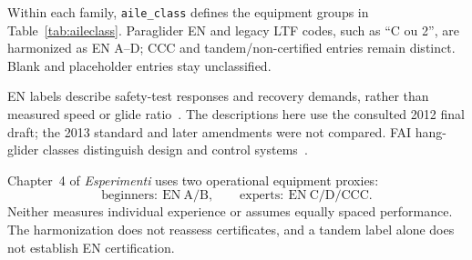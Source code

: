 Within each family, \texttt{aile\_class} defines the equipment groups in
Table~\ref{tab:aileclass}. Paraglider EN and legacy LTF codes, such as
\enquote{C ou 2}, are harmonized as EN A--D; CCC and tandem/non-certified entries
remain distinct. Blank and placeholder entries stay unclassified.

EN labels describe safety-test responses and recovery demands, rather than
measured speed or glide ratio~\cite{fpren926_2_2012}. The descriptions here use
the consulted 2012 final draft; the 2013 standard and later amendments were not
compared. FAI hang-glider classes distinguish design and control
systems~\cite{fai_sc7_2024}.

Chapter~4 of \emph{Esperimenti} uses two operational equipment proxies:
\[
 \text{beginners}:\ \mathrm{EN\ A/B},\qquad
 \text{experts}:\ \mathrm{EN\ C/D/CCC}.
\]
Neither measures individual experience or assumes equally spaced performance.
The harmonization does not reassess certificates, and a tandem label alone does
not establish EN certification.

